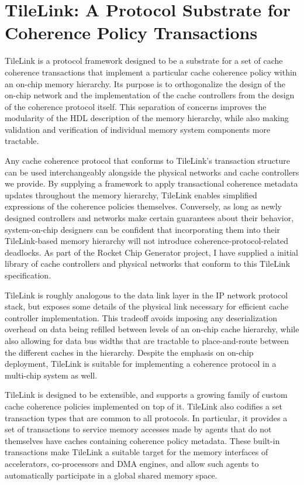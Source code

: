 \chapter{TileLink: A Protocol Substrate for Coherence Policy Transactions }
\label{c.tilelink}

TileLink is a protocol framework designed to be a substrate for a set of cache coherence transactions
that implement a particular cache coherence policy within an on-chip memory hierarchy.
Its purpose is to orthogonalize the design of the on-chip network and the implementation of the cache controllers from the design of the coherence protocol itself.
This separation of concerns improves the modularity of the HDL description of the memory hierarchy,
while also making validation and verification of individual memory system components more tractable.

Any cache coherence protocol that conforms to TileLink's transaction structure can be used interchangeably alongside the physical networks and cache controllers we provide.
By supplying a framework to apply transactional coherence metadata updates throughout the memory hierarchy, TileLink enables simplified expressions of the coherence policies themselves.
Conversely, as long as newly designed controllers and networks make certain guarantees about their behavior,
system-on-chip designers can be confident that incorporating them into their TileLink-based memory hierarchy will not introduce coherence-protocol-related deadlocks.
As part of the Rocket Chip Generator project, I have supplied a initial library of cache controllers and physical networks that conform to this TileLink specification.

TileLink is roughly analogous to the data link layer in the IP network protocol stack, but exposes some details of the physical link necessary for efficient cache controller implementation.
This tradeoff avoids imposing any deserialization overhead on data being refilled between levels of an on-chip cache hierarchy, while also allowing for data bus widths
that are tractable to place-and-route between the different caches in the hierarchy.
Despite the emphasis on on-chip deployment, TileLink is suitable for implementing a coherence protocol in a multi-chip system as well.

TileLink is designed to be extensible, and supports a growing family of custom cache coherence policies implemented on top of it.
TileLink also codifies a set transaction types that are common to all protocols.
In particular, it provides a set of transactions to service memory accesses made by agents that do not themselves have caches containing coherence policy metadata.
These built-in transactions make TileLink a suitable target for the memory interfaces of accelerators, co-processors and DMA engines,
and allow such agents to automatically participate in a global shared memory space.

